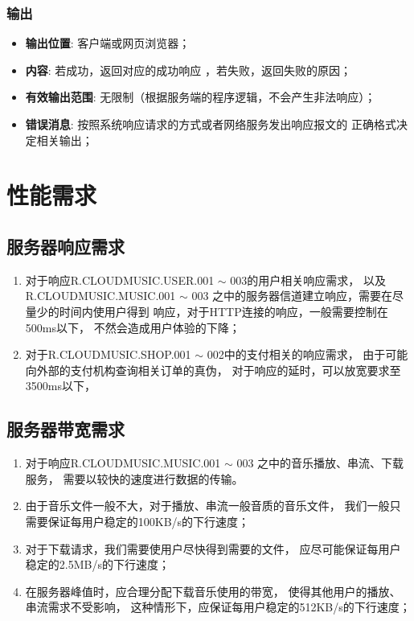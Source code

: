 \begin{enumerate}
\subsubsection{输出}
\begin{itemize}
	\item \textbf{输出位置}: 客户端或网页浏览器；
	\item \textbf{内容}: 若成功，返回对应的成功响应 ，若失败，返回失败的原因；
	\item \textbf{有效输出范围}: 无限制（根据服务端的程序逻辑，不会产生非法响应）；
	\item \textbf{错误消息}: 按照系统响应请求的方式或者网络服务发出响应报文的
		正确格式决定相关输出；
\end{itemize}

\section{性能需求}

\subsection{服务器响应需求}
\begin{enumerate}
	\item 对于响应R.CLOUDMUSIC.USER.001 $\sim$ 003的用户相关响应需求，
		以及R.CLOUDMUSIC.MUSIC.001 $\sim$ 003
		之中的服务器信道建立响应，需要在尽量少的时间内使用户得到
		响应，对于HTTP连接的响应，一般需要控制在500ms以下，
		不然会造成用户体验的下降；
	\item 对于R.CLOUDMUSIC.SHOP.001 $\sim$ 002中的支付相关的响应需求，
		由于可能向外部的支付机构查询相关订单的真伪，
		对于响应的延时，可以放宽要求至3500ms以下，
\end{enumerate}

\subsection{服务器带宽需求}
\begin{enumerate}
	\item 对于响应R.CLOUDMUSIC.MUSIC.001 $\sim$ 003
		之中的音乐播放、串流、下载服务，
		需要以较快的速度进行数据的传输。
	\item 由于音乐文件一般不大，对于播放、串流一般音质的音乐文件，
		我们一般只需要保证每用户稳定的100KB/s的下行速度；
	\item 对于下载请求，我们需要使用户尽快得到需要的文件，
		应尽可能保证每用户稳定的2.5MB/s的下行速度；
	\item 在服务器峰值时，应合理分配下载音乐使用的带宽，
		使得其他用户的播放、串流需求不受影响，
		这种情形下，应保证每用户稳定的512KB/s的下行速度；
\end{enumerate}


\end{enumerate}
